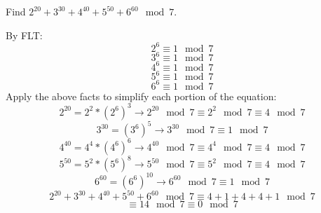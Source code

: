 \question Find $2^{20} + 3^{30} + 4^{40} + 5^{50} + 6^{60} \mod 7$.
\begin{solution} [1 in]
By FLT:
\[2^6 \equiv 1 \mod 7\]
\[3^6 \equiv 1 \mod 7\]
\[4^6 \equiv 1 \mod 7\]
\[5^6 \equiv 1 \mod 7\]
\[6^6 \equiv 1 \mod 7 \]
Apply the above facts to simplify each portion of the equation:
\[2^{20} = 2^2 * (2^6)^3  \rightarrow 	2^{20} \mod 7 \equiv 2^2 
\mod 7 \equiv 4 \mod 7\]
\[3^{30} = (3^6)^5 \rightarrow 	3^{30} \mod 7 \equiv 1 \mod 7\]
\[4^{40} = 4^4 * (4^6)^6 	\rightarrow	4^{40} \mod 7 \equiv 4^4 
\mod 7  \equiv 4 \mod 7\]
\[5^{50} = 5^2 * (5^6)^8 	\rightarrow 	5^{50}  \mod 7 \equiv 5^2 
\mod 7 \equiv 4 \mod 7\]
\[6^{60} = (6^6)^{10}	\rightarrow 	6^{60} \mod 7 \equiv 1 \mod 7\]
\[2^{20} + 3^{30} + 4^{40} + 5^{50} + 6^{60} \mod 7 \equiv 4 + 1 + 4 + 
4 + 1 \mod 7\]
				  \[\equiv 14 \mod 7 \equiv  0 \mod 7\]
\end{solution}